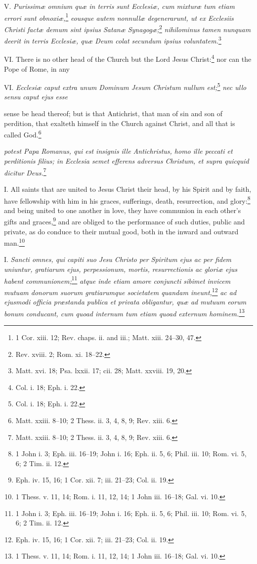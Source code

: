 V. \emph{Purissimæ omnium quæ in terris sunt Ecclesiæ, cum mixturæ tum etiam errori sunt obnoxiæ,}\footnote{1 Cor. xiii. 12; Rev. chaps. ii. and iii.; Matt. xiii. 24–30, 47.}\emph{ eousque autem nonnullæ degenerarunt, ut ex Ecclesiis Christi factæ demum sint ipsius Satanæ Synagogæ;}\footnote{Rev. xviii. 2; Rom. xi. 18–22.}\emph{ nihilominus tamen nunquam deerit in terris Ecclesiæ, quæ Deum colat secundum ipsius voluntatem.}\footnote{Matt. xvi. 18; Psa. lxxii. 17; cii. 28; Matt. xxviii. 19, 20.}

VI. There is no other head of the Church but the Lord Jesus Christ:\footnote{Col. i. 18; Eph. i. 22.} nor can the Pope of Rome, in any

VI. \emph{Ecclesiæ caput extra unum Dominum Jesum Christum nullum est;}\footnote{Col. i. 18; Eph. i. 22.}\emph{ nec ullo sensu caput ejus esse }

sense be head thereof; but is that Antichrist, that man of sin and son of perdition, that exalteth himself in the Church against Christ, and all that is called God.\footnote{Matt. xxiii. 8–10; 2 Thess. ii. 3, 4, 8, 9; Rev. xiii. 6.}

\emph{potest Papa Romanus, qui est insignis ille Antichristus, homo ille peccati et perditionis filius; in Ecclesia semet efferens adversus Christum, et supra quicquid dicitur Deus.}\footnote{Matt. xxiii. 8–10; 2 Thess. ii. 3, 4, 8, 9; Rev. xiii. 6.}


I. All saints that are united to Jesus Christ their head, by his Spirit and by faith, have fellowship with him in his graces, sufferings, death, resurrection, and glory:\footnote{1 John i. 3; Eph. iii. 16–19; John i. 16; Eph. ii. 5, 6; Phil. iii. 10; Rom. vi. 5, 6; 2 Tim. ii. 12.} and being united to one another in love, they have communion in each other's gifts and graces,\footnote{Eph. iv. 15, 16; 1 Cor. xii. 7; iii. 21–23; Col. ii. 19.} and are obliged to the performance of such duties, public and private, as do conduce to their mutual good, both in the inward and outward man.\footnote{1 Thess. v. 11, 14; Rom. i. 11, 12, 14; 1 John iii. 16–18; Gal. vi. 10.}

I. \emph{Sancti omnes, qui capiti suo Jesu Christo per Spiritum ejus ac per fidem uniuntur, gratiarum ejus, perpessionum, mortis, resurrectionis ac gloriæ ejus habent communionem;}\footnote{1 John i. 3; Eph. iii. 16–19; John i. 16; Eph. ii. 5, 6; Phil. iii. 10; Rom. vi. 5, 6; 2 Tim. ii. 12.}\emph{ atque inde etiam amore conjuncti sibimet invicem mutuam donorum suorum gratiarumque societatem quandam ineunt,}\footnote{Eph. iv. 15, 16; 1 Cor. xii. 7; iii. 21–23; Col. ii. 19.}\emph{ ac ad ejusmodi officia præstanda publica et privata obligantur, quæ ad mutuum eorum bonum conducant, cum quoad internum tum etiam quoad externum hominem.}\footnote{1 Thess. v. 11, 14; Rom. i. 11, 12, 14; 1 John iii. 16–18; Gal. vi. 10.}

